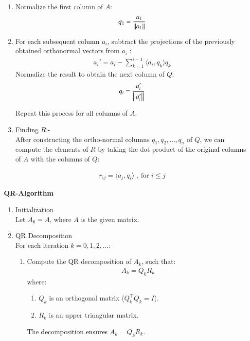 \documentclass[journal]{IEEEtran}
\begin{document}
\begin{enumerate}
\begin{enumerate}
\begin{enumerate}
\item Normalize the first column of $A$:
\begin{align}
q_1 = \frac{a_1}{\left\lVert a_1\right\rVert}
\end{align}

\item  For each subsequent column $ a_i $, subtract the projections of the previously obtained orthonormal vectors from $ a_i $ :
\begin{align}
a_i' = a_i - \sum_{k=1}^{i-1} \langle a_i, q_k \rangle q_k
\end{align}
Normalize the result to obtain the next column of \( Q \):
\begin{align}
q_i = \frac{a_i'}{\left\lVert a_i'\right\rVert}
\end{align}

Repeat this process for all columns of \( A \).

\item Finding $R$:- \\
After constructing the ortho-normal columns $ q_1, q_2, \dots, q_n $ of $Q$, we can compute the elements of $R$ by taking the dot product of the original columns of $A$ with the columns of $Q$:

\begin{align}
    r_{ij} = \langle a_j, q_i \rangle \text{ , for  }  i \leq j 
\end{align}
\end{enumerate}



\textbf{QR-Algorithm}\\
\begin{enumerate}
\item Initialization \\
Let $A_0 = A $, where $A$ is the given matrix.

\item QR Decomposition \\
For each iteration $ k = 0, 1, 2, \dots $:
\begin{enumerate}
    \item Compute the QR decomposition of \( A_k \), such that:
    \begin{align}
    A_k = Q_k R_k
    \end{align}
    where:
    \begin{enumerate}
        \item $Q_k $ is an orthogonal matrix ($ Q_k^\top Q_k = I $).
        \item $ R_k $ is an upper triangular matrix.
    \end{enumerate}
    The decomposition ensures $ A_k = Q_k R_k $.


\end{enumerate}
\end{enumerate}
\end{enumerate}
\end{enumerate}
\end{document}
